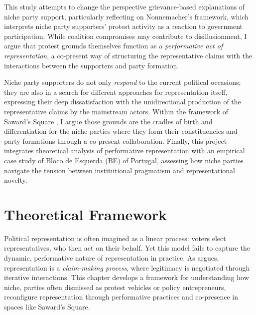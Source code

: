 This study attempts to change the perspective grievance-based explanations of niche party support, particularly reflecting on Nonnemacher’s \parencite*{nonnemacher2023} framework, which interprets niche party supporters’ protest activity as a reaction to government participation. While coalition compromises may contribute to disillusionment, I argue that protest grounds themselves function as a \textit{performative act of representation}, a co-present way of structuring the representative claims with the interactions between the supporters and party formation.

Niche party supporters do not only \textit{respond} to the current political occasions; they are also in a search for different approaches for representation itself, expressing their deep dissatisfaction with the unidirectional production of the representative claims by the mainstream actors.  Within the framework of Saward’s Square \parencite[]{saward2024} , I argue those grounds are the cradles of birth and differentiation for the niche parties where they form their constituencies and party formations through a co-present collaboration.
Finally, this project integrates theoretical analysis of performative representation with an empirical case study of Bloco de Esquerda (BE) of Portugal, assessing how niche parties navigate the tension between institutional pragmatism and representational novelty.

\chapter{Theoretical Framework}\label{chap:Theoretical Framework} %

Political representation is often imagined as a linear process: voters elect representatives, who then act on their behalf. Yet this model fails to capture the dynamic, performative nature of representation in practice. As \textcite{saward2010} argues, representation is a \textit{claim-making process}, where legitimacy is negotiated through iterative interactions. This chapter develops a framework for understanding how niche, parties often dismissed as protest vehicles or policy entrepreneurs, reconfigure representation through performative practices and co-presence in spaces like Saward’s Square.

